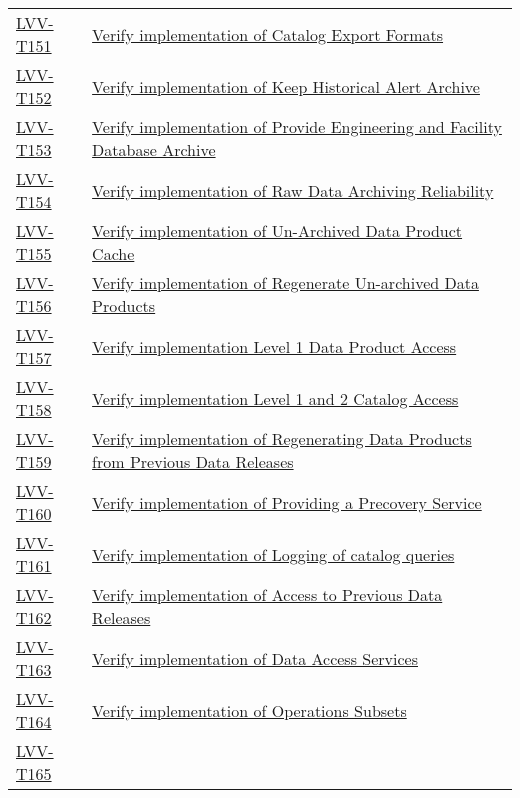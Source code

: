\begin{longtable}[]{p{3cm}p{13cm}}
    \hyperref[lvv-t151]{LVV-T151} &
    \href{https://jira.lsstcorp.org/secure/Tests.jspa\#/testCase/LVV-T151}{Verify implementation of Catalog Export Formats} \tabularnewline
    \hyperref[lvv-t152]{LVV-T152} &
    \href{https://jira.lsstcorp.org/secure/Tests.jspa\#/testCase/LVV-T152}{Verify implementation of Keep Historical Alert Archive} \tabularnewline
    \hyperref[lvv-t153]{LVV-T153} &
    \href{https://jira.lsstcorp.org/secure/Tests.jspa\#/testCase/LVV-T153}{Verify implementation of Provide Engineering and Facility Database Archive} \tabularnewline
    \hyperref[lvv-t154]{LVV-T154} &
    \href{https://jira.lsstcorp.org/secure/Tests.jspa\#/testCase/LVV-T154}{Verify implementation of Raw Data Archiving Reliability} \tabularnewline
    \hyperref[lvv-t155]{LVV-T155} &
    \href{https://jira.lsstcorp.org/secure/Tests.jspa\#/testCase/LVV-T155}{Verify implementation of Un-Archived Data Product Cache} \tabularnewline
    \hyperref[lvv-t156]{LVV-T156} &
    \href{https://jira.lsstcorp.org/secure/Tests.jspa\#/testCase/LVV-T156}{Verify implementation of Regenerate Un-archived Data Products} \tabularnewline
    \hyperref[lvv-t157]{LVV-T157} &
    \href{https://jira.lsstcorp.org/secure/Tests.jspa\#/testCase/LVV-T157}{Verify implementation Level 1 Data Product Access} \tabularnewline
    \hyperref[lvv-t158]{LVV-T158} &
    \href{https://jira.lsstcorp.org/secure/Tests.jspa\#/testCase/LVV-T158}{Verify implementation Level 1 and 2 Catalog Access} \tabularnewline
    \hyperref[lvv-t159]{LVV-T159} &
    \href{https://jira.lsstcorp.org/secure/Tests.jspa\#/testCase/LVV-T159}{Verify implementation of Regenerating Data Products from Previous Data Releases} \tabularnewline
    \hyperref[lvv-t160]{LVV-T160} &
    \href{https://jira.lsstcorp.org/secure/Tests.jspa\#/testCase/LVV-T160}{Verify implementation of Providing a Precovery Service} \tabularnewline
    \hyperref[lvv-t161]{LVV-T161} &
    \href{https://jira.lsstcorp.org/secure/Tests.jspa\#/testCase/LVV-T161}{Verify implementation of Logging of catalog queries} \tabularnewline
    \hyperref[lvv-t162]{LVV-T162} &
    \href{https://jira.lsstcorp.org/secure/Tests.jspa\#/testCase/LVV-T162}{Verify implementation of Access to Previous Data Releases} \tabularnewline
    \hyperref[lvv-t163]{LVV-T163} &
    \href{https://jira.lsstcorp.org/secure/Tests.jspa\#/testCase/LVV-T163}{Verify implementation of Data Access Services} \tabularnewline
    \hyperref[lvv-t164]{LVV-T164} &
    \href{https://jira.lsstcorp.org/secure/Tests.jspa\#/testCase/LVV-T164}{Verify implementation of Operations Subsets} \tabularnewline
    \hyperref[lvv-t165]{LVV-T165} &

\end{longtable}
